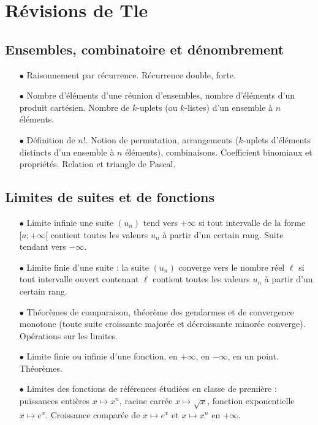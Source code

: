 \documentclass[french,bookmarks]{article}
\begin{document}
    \pagestyle{fancy}
    \fancyhf{}
    \cfoot{\thepage}
    
    \section*{Révisions de Tle}
    
    \subsection*{Ensembles, combinatoire et dénombrement}
    
    \begin{enumerate}
        \item[$\bullet$] Raisonnement par récurrence. Récurrence double, forte.
        
        \item[$\bullet$] Nombre d'éléments d'une réunion d'ensembles, nombre d'éléments d'un produit cartésien. Nombre de $k$-uplets (ou $k$-listes) d'un ensemble à $n$ éléments.
        
        \item[$\bullet$] Définition de $n!$. Notion de permutation, arrangements ($k$-uplets d'éléments distincts d'un ensemble à $n$ éléments), combinaisons. Coefficient binomiaux et propriétés. Relation et triangle de Pascal.
    \end{enumerate}
    
    \subsection*{Limites de suites et de fonctions}
    
    \begin{enumerate}
        \item[$\bullet$] Limite infinie une suite $(u_n)$ tend vers $+\infty$ si tout intervalle de la forme $[a ; +\infty[$ contient toutes les valeurs $u_n$ à partir d'un certain rang. Suite tendant vers $-\infty$.
        
        \item[$\bullet$] Limite finie d'une suite : la suite $(u_n)$ converge vers le nombre réel $\ell$ si tout intervalle ouvert contenant $\ell$ contient toutes les valeurs $u_n$ à partir d'un certain rang.
        
        \item[$\bullet$] Théorèmes de comparaison, théorème des gendarmes et de convergence monotone (toute suite croissante majorée et décroissante minorée converge). Opérations sur les limites.
        
        \item[$\bullet$] Limite finie ou infinie d'une fonction, en $+\infty$, en $-\infty$, en un point. Théorèmes.
        
        \item [$\bullet$] Limites des fonctions de références étudiées en classe de première : puissances entières $x \mapsto x^n$, racine carrée $x \mapsto \sqrt{x}$, fonction exponentielle $x \mapsto e^x$. Croissance comparée de $x \mapsto e^x$ et $x \mapsto x^n$ en $+\infty$.
    \end{enumerate}
    
\end{document}
